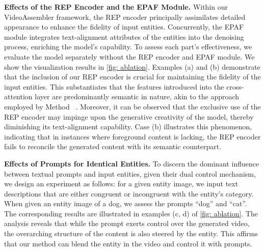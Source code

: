 \noindent
\textbf{Effects of the REP Encoder and the EPAF Module.} Within our VideoAssembler framework, the REP encoder principally assimilates detailed appearance to enhance the fidelity of input entities. Concurrently, the EPAF module integrates text-alignment attributes of the entities into the denoising process, enriching the model's capability. 
To assess each part's effectiveness, we evaluate the model separately without the REP encoder and EPAF module.
We show the visualization results in \cref{fig: ablation}. Examples (a) and (b) demonstrate that the inclusion of our REP encoder is crucial for maintaining the fidelity of the input entities. This substantiates that the features introduced into the cross-attention layer are predominantly semantic in nature, akin to the approach employed by Method ~\cite{wang2023videocomposer}. Moreover, it can be observed that the exclusive use of the REP encoder may impinge upon the generative creativity of the model, thereby diminishing its text-alignment capability. Case (b) illustrates this phenomenon, indicating that in instances where foreground content is lacking, the REP encoder fails to reconcile the generated content with its semantic counterpart.

\noindent
\textbf{Effects of Prompts for Identical Entities.} To discern the dominant influence between textual prompts and input entities, given their dual control mechanism, we design an experiment as follows: for a given entity image, we input text descriptions that are either congruent or incongruent with the entity's category. When given an entity image of a dog, we assess the prompts ``dog'' and ``cat''. The corresponding results are illustrated in examples (c, d) of \cref{fig: ablation}. The analysis reveals that while the prompt exerts control over the generated video, the overarching structure of the content is also steered by the entity. 
This affirms that our method can blend the entity in the video and control it with prompts.